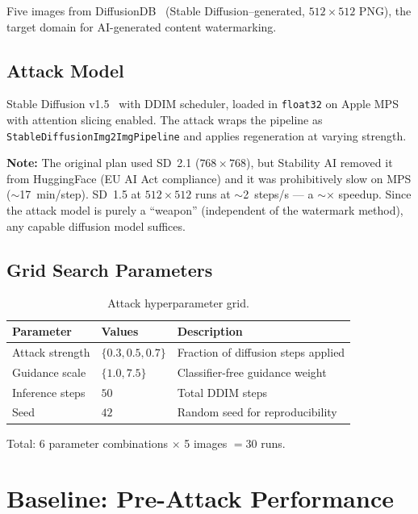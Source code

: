 \documentclass[11pt,a4paper]{article}
\begin{document}
Five images from DiffusionDB~\cite{diffusiondb} (Stable
Diffusion--generated, $512 \times 512$ PNG), the target domain for
AI-generated content watermarking.

\subsection{Attack Model}

Stable Diffusion v1.5~\cite{sd15} with DDIM scheduler, loaded in
\texttt{float32} on Apple MPS with attention slicing enabled. The attack
wraps the pipeline as \texttt{StableDiffusionImg2ImgPipeline} and applies
regeneration at varying strength.

\textbf{Note:} The original plan used SD~2.1 ($768 \times 768$), but
Stability AI removed it from HuggingFace (EU AI Act compliance) and it
was prohibitively slow on MPS ($\sim$17~min/step). SD~1.5 at $512 \times
512$ runs at $\sim$2~steps/s --- a $\sim$$\times$ speedup. Since
the attack model is purely a ``weapon'' (independent of the watermark
method), any capable diffusion model suffices.

\subsection{Grid Search Parameters}

\begin{table}[h]
\centering
\caption{Attack hyperparameter grid.}
\label{tab:grid}
\begin{tabular}{lll}
\toprule
\textbf{Parameter} & \textbf{Values} & \textbf{Description} \\
\midrule
Attack strength & $\{0.3, 0.5, 0.7\}$ & Fraction of diffusion steps applied \\
Guidance scale  & $\{1.0, 7.5\}$       & Classifier-free guidance weight \\
Inference steps & $50$                  & Total DDIM steps \\
Seed            & $42$                  & Random seed for reproducibility \\
\bottomrule
\end{tabular}
\end{table}

Total: 6 parameter combinations $\times$ 5 images $= 30$ runs.

\section{Baseline: Pre-Attack Performance}
\label{sec:baseline}
\end{document}
